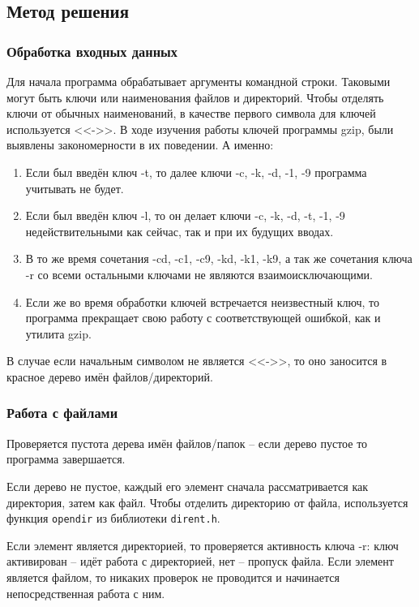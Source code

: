 \documentclass[12pt]{article}
\begin{document}
\subsection*{Метод решения}

\subsubsection*{Обработка входных данных}

Для начала программа обрабатывает аргументы командной строки. Таковыми могут быть ключи или наименования файлов и директорий. Чтобы отделять ключи от обычных наименований, в качестве первого символа для ключей используется <<->>. В ходе изучения работы ключей программы gzip, были выявлены закономерности в их поведении. А именно:

\begin{enumerate}
    \item Если был введён ключ -t, то далее ключи -c, -k, -d, -1, -9 программа учитывать не будет.
    \item Если был введён ключ -l, то он делает ключи -c, -k, -d, -t, -1, -9 недействительными как сейчас, так и при их будущих вводах.
    \item В то же время сочетания -cd, -c1, -c9, -kd, -k1, -k9, а так же сочетания ключа -r со всеми остальными ключами не являются взаимоисключающими.
    \item Если же во время обработки ключей встречается неизвестный ключ, то программа прекращает свою работу с соответствующей ошибкой, как и утилита gzip.
\end{enumerate}

В случае если начальным символом не является <<->>, то оно заносится в красное дерево имён файлов/директорий. 

\subsubsection*{Работа с файлами}

Проверяется пустота дерева имён файлов/папок -- если дерево пустое то программа завершается. 

Если дерево не пустое, каждый его элемент сначала рассматривается как директория, затем как файл. Чтобы отделить директорию от файла, используется функция \texttt{opendir} из библиотеки \texttt{dirent.h}.

Если элемент является директорией, то проверяется активность ключа -r: ключ активирован -- идёт работа с директорией, нет -- пропуск файла. Если элемент является файлом, то никаких проверок не проводится и начинается непосредственная работа с ним.
\end{document}
